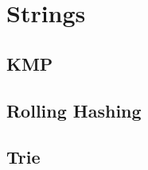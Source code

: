 \documentclass[../Notes/main.tex]{subfiles}
\begin{document}
\section{Strings}

\subsection{KMP}


\subsection{Rolling Hashing}


\subsection{Trie}

\end{document}
